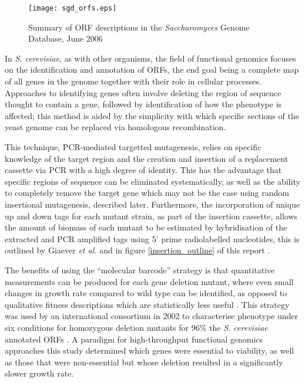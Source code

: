 \begin{figure}
\centering
\texttt{[image: sgd\_orfs.eps]}
\caption[ORF descriptions in the \emph{Saccharomyces} Genome Database]{Summary of ORF descriptions in the \emph{Saccharomyces} Genome Database, June 2006}
\label{figure:orf_totals}
\end{figure}

In \emph{S. cerevisiae}, as with other organisms, the field of functional genomics focuses on the identification and annotation of ORFs, the end goal being a complete map of all genes in the genome together with their role in cellular processes. Approaches to identifying genes often involve deleting the region of sequence thought to contain a gene, followed by identification of how the phenotype is affected; this method is aided by the simplicity with which specific sections of the yeast genome can be replaced via homologous recombination.

This technique, PCR-mediated targetted mutagenesis, relies on specific knowledge of the target region and the creation and insertion of a replacement cassette via PCR with a high degree of identity. This has the advantage that specific regions of sequence can be eliminated systematically, as well as the ability to completely remove the target gene which may not be the case using random insertional mutagenesis, described later. Furthermore, the incorporation of unique up and down tags for each mutant strain, as part of the insertion cassette, allows the amount of biomass of each mutant to be estimated by hybridisation of the extracted and PCR amplified tags using 5' prime radiolabelled nucleotides, this is outlined by Giaever \emph{et al.}\cite{giaever1999} and in figure \vref{insertion_outline} of this report \cite{delneri2004,wach1996,wach1994}.

The benefits of using the ``molecular barcode'' strategy is that quantitative measurements can be produced for each gene deletion mutant, where even small changes in growth rate compared to wild type can be identified, as opposed to qualitative fitness descriptions which are statistically less useful \cite{oliver2002,winzeler1999}. This strategy was used by an international consortium in 2002 to characterise phenotype under six conditions for homozygous deletion mutants for 96\% the \emph{S. cerevisiae} annotated ORFs \cite{giaever2002}. A paradigm for high-throughput functional genomics approaches this study determined which genes were essential to viability, as well as those that were non-essential but whose deletion resulted in a significantly slower growth rate.

